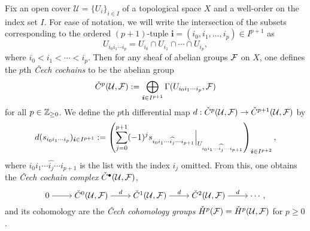 \begin{definition}
  Fix an open cover $\mathcal{U} = \{U_i\}_{i \in I}$ of a
  topological space $X$ and a well-order on the index set $I$.
  For ease of notation, we will write the intersection of the subsets
  corresponding to the ordered $(p + 1)$-tuple $\bm{i} = (i_0, i_1,
  \ldots, i_p) \in I^{p + 1}$ as
  \[
    U_{i_0 i_1 \cdots i_p} = U_{i_0} \cap U_{i_1} \cap \cdots \cap U_{i_p},
  \]
  where $i_0 < i_1 < \cdots < i_p$.
  Then for any sheaf of abelian groups $\mathcal{F}$ on $X$, one defines
  the $p$th \emph{\v{C}ech cochains} to be the abelian group
  \[
    \check{C}^{p}({\mathcal{U}}, {\mathcal{F}})
    :=
    \bigoplus_{\bm{i} \in I^{p + 1}} \Gamma({U_{i_0 i_1 \cdots i_p}}, {\mathcal{F}})
  \]
  for all $p \in \mathbb{Z}_{\geq 0}$.
  We define the $p$th differential map $d:
  \check{C}^{p}({\mathcal{U}}, {\mathcal{F}}) \to \check{C}^{p +
  1}({\mathcal{U}}, {\mathcal{F}})$ by
  \begin{align*}
    d(s_{i_0 i_1 \cdots i_p})_{\bm{i} \in I^{p + 1}}
    :=
    \left(\sum_{j = 0}^{p + 1} (-1)^j \setres{s_{i_0 i_1 \cdots
      \widehat{i_j} \cdots i_{p + 1}}}{U_{i_0 i_1 \cdots \widehat{i_j}
    \cdots i_{p + 1}}}\right)_{\bm{i} \in I^{p + 2}},
  \end{align*}
  where $i_0 i_1 \cdots \widehat{i_j} \cdots i_{p + 1}$ is the list
  with the index $i_j$ omitted.
  From this, one obtains the \emph{\v{C}ech cochain complex}
  $\check{C}^{\bullet}({\mathcal{U}}, {\mathcal{F}})$,
  \[
    \begin{tikzcd}[cramped]
      0 & {\cechcochain{0}{\mathcal{U}}{\shf{F}}} &
      {\cechcochain{1}{\mathcal{U}}{\shf{F}}} &
      {\cechcochain{2}{\mathcal{U}}{\shf{F}}} & \cdots,
      \arrow[from=1-1, to=1-2]
      \arrow["d", from=1-2, to=1-3]
      \arrow["d", from=1-3, to=1-4]
      \arrow["d", from=1-4, to=1-5]
    \end{tikzcd}
  \]
  and its cohomology are the \emph{\v{C}ech cohomology groups}
  $\check{H}^{p}({\mathcal{F}}) = \check{H}^{p}({\mathcal{U}}, {\mathcal{F}})$ for $p \geq 0$.
\end{definition}

